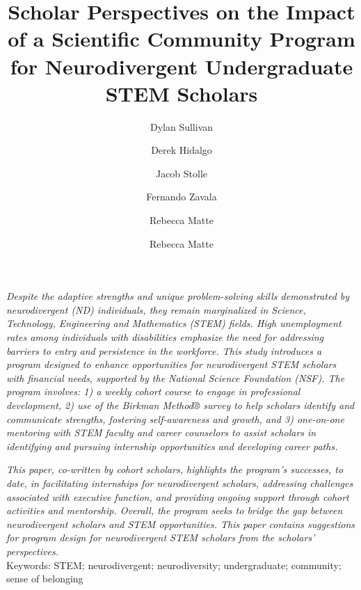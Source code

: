 \documentclass[11.5pt]{sig-alternate}
\makeatletter
\let\oldabstract\abstract
\let\oldendabstract\endabstract
\renewenvironment{abstract}
{\renewenvironment{quotation}%
               {\list{}{\addtolength{\leftmargin}{1em} %
                        \listparindent 1.5em%
                        \itemindent    \listparindent%
                        \rightmargin   \leftmargin%
                        \parsep        \z@ \@plus\p@}%
                \item\relax}%
               {\endlist}%
\oldabstract}
{\oldendabstract}
\makeatother
\begin{document}
\title{Scholar Perspectives on the Impact of a Scientific Community Program for Neurodivergent Undergraduate STEM Scholars}

\author[1]{\large \color{blue} Dylan Sullivan}
\author[1]{\large \color{blue} Derek Hidalgo}
\author[1]{\large \color{blue} Jacob Stolle}
\author[1]{\large \color{blue} Fernando Zavala}
\author[1]{\large \color{blue} Rebecca Matte}
\author[1]{\large \color{blue} Rebecca Matte}



\toappear{}

\maketitle
\begin{@twocolumnfalse} 
\begin{abstract}
\item 
\begin{large}
 \textit{Despite the adaptive strengths and unique problem-solving skills demonstrated by neurodivergent (ND) individuals, they remain marginalized in Science, Technology, Engineering and Mathematics (STEM) fields. High unemployment rates among individuals with disabilities emphasize the need for addressing barriers to entry and persistence in the workforce. This study introduces a program designed to enhance opportunities for neurodivergent STEM scholars with financial needs, supported by the National Science Foundation (NSF). The program involves: 1) a weekly cohort course to engage in professional development, 2) use of the Birkman Method® survey to help scholars identify and communicate strengths, fostering self-awareness and growth, and 3) one-on-one mentoring with STEM faculty and career counselors to assist scholars in identifying and pursuing internship opportunities and developing career paths.}
 
\textit{This paper, co-written by cohort scholars, highlights the program’s successes, to date, in facilitating internships for neurodivergent scholars, addressing challenges associated with executive function, and providing ongoing support through cohort activities and mentorship. Overall, the program seeks to bridge the gap between neurodivergent scholars and STEM opportunities. This paper contains suggestions for program design for neurodivergent STEM scholars from the scholars’ perspectives.}\\
 

  
    
 Keywords: STEM; neurodivergent; neurodiversity; undergraduate; community; sense of belonging
 \end{large}     
\end{abstract}
\end{@twocolumnfalse}
\end{document}
